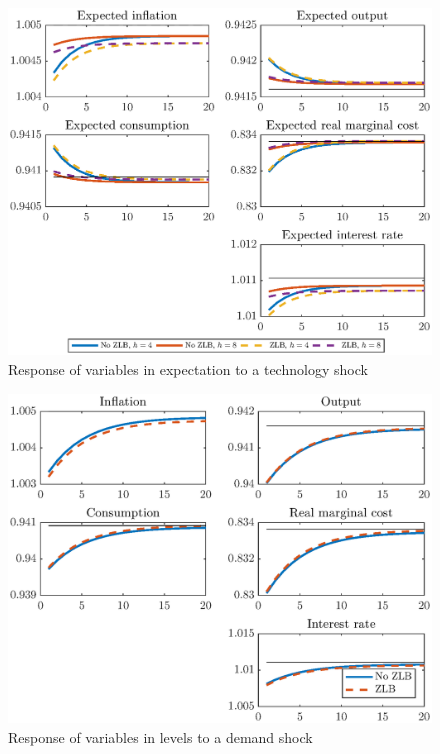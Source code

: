 \documentclass[12pt]{article}
\numberwithin{equation}{section}
\begin{document}
\begin{figure}[H]
	\centering
	\caption{Response of variables in expectation to a technology shock}\label{fig:m2_irfExp_tfp}
	\includegraphics[scale=0.7]{m3_irfExp_tfp}
\end{figure}

\begin{figure}[H]
	\centering
	\caption{Response of variables in levels to a demand shock}\label{fig:m2_irfLevel_pref}
	\includegraphics[scale=0.7]{m3_irfLevel_pref}
\end{figure}
\end{document}
